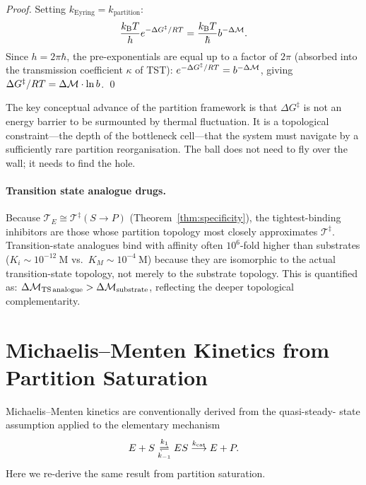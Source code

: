 \begin{proof}
Setting $k_{\mathrm{Eyring}} = k_{\mathrm{partition}}$:
\begin{equation}
  \frac{k_{\mathrm{B}} T}{h} e^{-\Delta G^\ddagger / RT}
  = \frac{k_{\mathrm{B}} T}{\hbar} b^{-\Delta\mathcal{M}}.
\end{equation}
Since $h = 2\pi\hbar$, the pre-exponentials are equal up to a factor of
$2\pi$ (absorbed into the transmission coefficient $\kappa$ of TST):
$e^{-\Delta G^\ddagger / RT} = b^{-\Delta\mathcal{M}}$, giving
$\Delta G^\ddagger / RT = \Delta\mathcal{M} \cdot \ln b$. \qed
\end{proof}

The key conceptual advance of the partition framework is that
$\Delta G^\ddagger$ is not an energy barrier to be surmounted by thermal
fluctuation. It is a topological constraint---the depth of the bottleneck
cell---that the system must navigate by a sufficiently rare partition
reorganisation. The ball does not need to fly over the wall; it needs to
find the hole.

\paragraph{Transition state analogue drugs.}
Because $\mathcal{T}_E \cong \mathcal{T}^\ddagger(S \to P)$
(Theorem~\ref{thm:specificity}), the tightest-binding inhibitors are those
whose partition topology most closely approximates $\mathcal{T}^\ddagger$.
Transition-state analogues bind with affinity often $10^6$-fold higher than
substrates ($K_i \sim 10^{-12}\ \mathrm{M}$ vs.\ $K_M \sim 10^{-4}\ \mathrm{M}$)
because they are isomorphic to the actual transition-state topology, not merely
to the substrate topology. This is quantified as:
$\Delta\mathcal{M}_{\mathrm{TS\,analogue}} > \Delta\mathcal{M}_{\mathrm{substrate}}$,
reflecting the deeper topological complementarity.

\section{Michaelis--Menten Kinetics from Partition Saturation}
\label{sec:michaelis_menten}

Michaelis--Menten kinetics are conventionally derived from the quasi-steady-
state assumption applied to the elementary mechanism
\begin{equation}
  E + S \underset{k_{-1}}{\overset{k_1}{\rightleftharpoons}} ES
         \overset{k_{\mathrm{cat}}}{\longrightarrow} E + P.
  \label{eq:mm_mechanism}
\end{equation}
Here we re-derive the same result from partition saturation.

